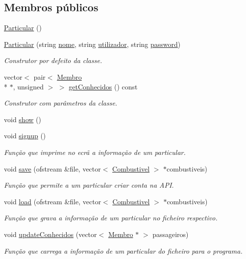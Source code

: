 \subsection*{Membros públicos}
\begin{DoxyCompactItemize}
\item 
\hyperlink{class_particular_ac348d7cd078bbc184cf12f7ac8c7e589}{Particular} ()
\item 
\hyperlink{class_particular_a00248cda34d52ac67b531ca3f71d557d}{Particular} (string \hyperlink{class_membro_a2598bbe34ae32a98f41468b2202a9555}{nome}, string \hyperlink{class_membro_a42cc733ff94ec8d1bbfdacc62dfbb0e7}{utilizador}, string \hyperlink{class_membro_ae2b12fc3e91efc674c07e735edf4ac21}{password})
\begin{DoxyCompactList}\small\item\em Construtor por defeito da classe. \end{DoxyCompactList}\item 
vector$<$ pair$<$ \hyperlink{class_membro}{Membro} \\*
$\ast$, unsigned $>$ $>$ \hyperlink{class_particular_a4449ee915348f09a2c5b96f3f8106a55}{get\+Conhecidos} () const 
\begin{DoxyCompactList}\small\item\em Construtor com parâmetros da classe. \end{DoxyCompactList}\item 
void \hyperlink{class_particular_a01235e9f582726e6068b176cd4b8795b}{show} ()
\item 
void \hyperlink{class_particular_aa8459c54108da82bb5ae21f2779c53da}{signup} ()
\begin{DoxyCompactList}\small\item\em Função que imprime no ecrã a informação de um particular. \end{DoxyCompactList}\item 
void \hyperlink{class_particular_a3925d68794b2e91a9c46346e5110b013}{save} (ofstream \&file, vector$<$ \hyperlink{class_combustivel}{Combustivel} $>$ $\ast$combustiveis)
\begin{DoxyCompactList}\small\item\em Função que permite a um particular criar conta na A\+P\+I. \end{DoxyCompactList}\item 
void \hyperlink{class_particular_a1da22ddfc6b6fc1c562cf4dcdc649e2a}{load} (ofstream \&file, vector$<$ \hyperlink{class_combustivel}{Combustivel} $>$ $\ast$combustiveis)
\begin{DoxyCompactList}\small\item\em Função que grava a informação de um particular no ficheiro respectivo. \end{DoxyCompactList}\item 
void \hyperlink{class_particular_a544f2ee62236cd4734aa6a7e9848fbae}{update\+Conhecidos} (vector$<$ \hyperlink{class_membro}{Membro} $\ast$ $>$ passageiros)
\begin{DoxyCompactList}\small\item\em Função que carrega a informação de um particular do ficheiro para o programa. \end{DoxyCompactList}\end{DoxyCompactItemize}
